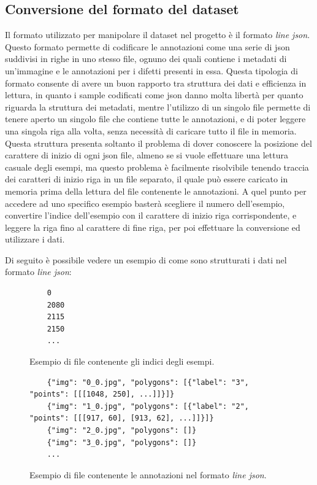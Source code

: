\subsection{Conversione del formato del dataset}
Il formato utilizzato per manipolare il dataset nel progetto è  il formato \textit{line json}.
Questo formato permette di codificare le annotazioni come una serie di json suddivisi in righe in uno stesso file,
ognuno dei quali contiene i metadati di un'immagine e le annotazioni per i difetti presenti in essa.
Questa tipologia di formato consente di avere un buon rapporto tra struttura dei dati e efficienza in lettura,
in quanto i sample codificati come json danno molta libertà per quanto riguarda la struttura dei metadati, 
mentre l'utilizzo di un singolo file permette di tenere aperto un singolo file che contiene tutte le annotazioni, 
e di poter leggere una singola riga alla volta, senza necessità di caricare tutto il file in memoria.\\
Questa struttura presenta soltanto il problema di dover conoscere la posizione del carattere di inizio di ogni json file,
almeno se si vuole effettuare una lettura casuale degli esempi, ma questo problema è facilmente risolvibile tenendo traccia dei caratteri di
inizio riga in un file separato, il quale può essere caricato in memoria prima della lettura del file contenente le annotazioni.
A quel punto per accedere ad uno specifico esempio basterà scegliere il numero dell'esempio, convertire l'indice dell'esempio con il carattere
di inizio riga corrispondente, e leggere la riga fino al carattere di fine riga, per poi effettuare la conversione ed utilizzare i dati.

Di seguito è possibile vedere un esempio di come sono strutturati i dati nel formato \textit{line json}:

\begin{figure}[H]
    \begin{verbatim}
    0
    2080
    2115
    2150
    ...
    \end{verbatim}
    \caption{Esempio di file contenente gli indici degli esempi.}
\end{figure}

\begin{figure}[H]
    \begin{verbatim}
    {"img": "0_0.jpg", "polygons": [{"label": "3", "points": [[[1048, 250], ...]]}]}
    {"img": "1_0.jpg", "polygons": [{"label": "2", "points": [[[917, 60], [913, 62], ...]]}]}
    {"img": "2_0.jpg", "polygons": []}
    {"img": "3_0.jpg", "polygons": []}
    ...
    \end{verbatim}
    \caption{Esempio di file contenente le annotazioni nel formato \textit{line json}.}
\end{figure}

